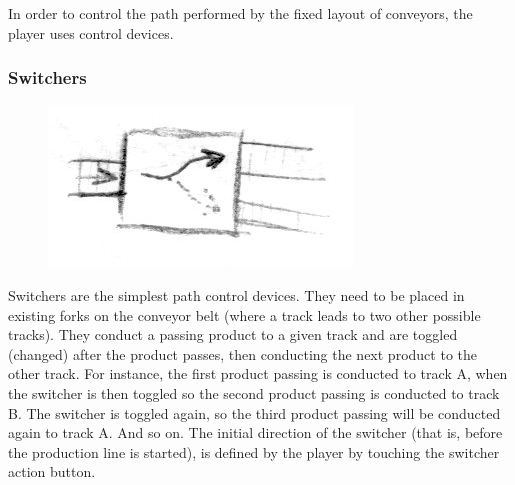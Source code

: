 \documentclass[a4paper]{scrartcl}
\begin{document}
        In order to control the path performed by the fixed layout of conveyors,
        the player uses control devices.

        \subsubsection{Switchers}
            \begin{minipage}[t][11em][t]{\textwidth}
                \begin{figure}
                    \vspace{-20pt}
                    \includegraphics[scale=1]{devices/switcher}
                    \vspace{-15pt}
                \end{figure}

                Switchers are the simplest path control devices. They need to be
                placed in existing forks on the conveyor belt (where a track
                leads to two other possible tracks). They conduct a passing
                product to a given track and are toggled (changed) after the
                product passes, then conducting the next product to the other
                track. For instance, the first product passing is conducted to
                track A, when the switcher is then toggled so the second product
                passing is conducted to track B. The switcher is toggled again,
                so the third product passing will be conducted again to track A.
                And so on. The initial direction of the switcher (that is,
                before the production line is started), is defined by the player
                by touching the switcher action button.
            \end{minipage}
\end{document}
